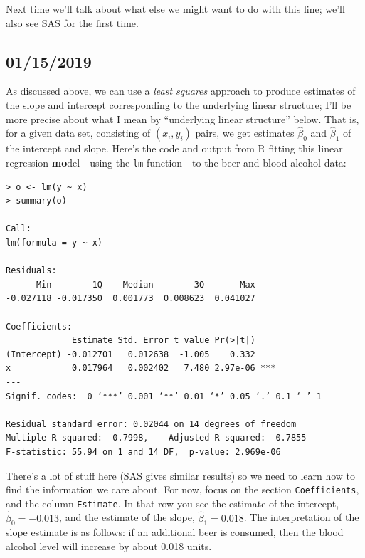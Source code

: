 \documentclass[a4paper, 12pt]{article}
\theoremstyle{plain}
\theoremstyle{definition}
\theoremstyle{remark}
\begin{document}
Next time we'll talk about what else we might want to do with this line; we'll also see SAS for the first time.


\subsection*{01/15/2019}

As discussed above, we can use a {\em least squares} approach to produce estimates of the slope and intercept corresponding to the underlying linear structure; I'll be more precise about what I mean by ``underlying linear structure'' below.  That is, for a given data set, consisting of $(x_i, y_i)$ pairs, we get estimates $\hat\beta_0$ and $\hat\beta_1$ of the intercept and slope.  Here's the code and output from R fitting this {\bf l}inear regression {\bf mo}del---using the {\tt lm} function---to the beer and blood alcohol data:
{\small 
\begin{verbatim}
> o <- lm(y ~ x)
> summary(o)

Call:
lm(formula = y ~ x)

Residuals:
      Min        1Q    Median        3Q       Max 
-0.027118 -0.017350  0.001773  0.008623  0.041027 

Coefficients:
             Estimate Std. Error t value Pr(>|t|)    
(Intercept) -0.012701   0.012638  -1.005    0.332    
x            0.017964   0.002402   7.480 2.97e-06 ***
---
Signif. codes:  0 ‘***’ 0.001 ‘**’ 0.01 ‘*’ 0.05 ‘.’ 0.1 ‘ ’ 1

Residual standard error: 0.02044 on 14 degrees of freedom
Multiple R-squared:  0.7998,	Adjusted R-squared:  0.7855 
F-statistic: 55.94 on 1 and 14 DF,  p-value: 2.969e-06
\end{verbatim}
}
There's a lot of stuff here (SAS gives similar results) so we need to learn how to find the information we care about.  For now, focus on the section {\tt Coefficients}, and the column {\tt Estimate}.  In that row you see the estimate of the intercept, $\hat\beta_0 = -0.013$, and the estimate of the slope, $\hat\beta_1=0.018$.  The interpretation of the slope estimate is as follows: if an additional beer is consumed, then the blood alcohol level will increase by about 0.018 units.  
\end{document}
